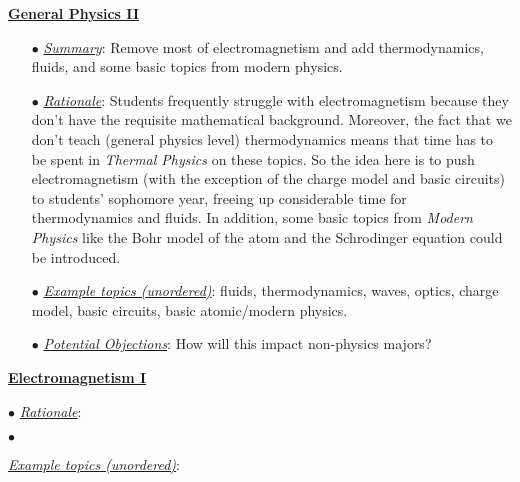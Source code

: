 \documentclass[12pt,preprint]{aastex}
\begin{document}
\begin{itemize*}
\item{\underline{{\bf General Physics II}}
  \begin{itemize}
    \item[$\bullet$]{\underline{\em Summary}: Remove most of electromagnetism
      and add thermodynamics, fluids, and some basic topics from modern
      physics.}
    \item[$\bullet$]{\underline{\em Rationale}: Students frequently struggle
      with electromagnetism because they don't have the requisite mathematical
      background.  Moreover, the fact that we don't teach (general physics
      level) thermodynamics means that time has to be spent in {\em Thermal
        Physics} on these topics.  So the idea here is to push electromagnetism
      (with the exception of the charge model and basic circuits) to students'
      sophomore year, freeing up considerable time for thermodynamics and
      fluids.  In addition, some basic topics from {\em Modern Physics} like the
      Bohr model of the atom and the Schrodinger equation could be introduced.}
    \item[$\bullet$]{\underline{\em Example topics (unordered)}: fluids,
      thermodynamics, waves, optics, charge model, basic circuits, basic
      atomic/modern physics.}
    \item[$\bullet$]{\underline{\em Potential Objections}: How will this impact
      non-physics majors?}
  \end{itemize}
}
  
\item{\underline{{\bf Electromagnetism I}}

  \begin{itemize*}
    \item[$\bullet$]{\underline{\em Rationale}: }
    \item[$\bullet$]{\underline{\em Example topics (unordered)}: 

}
  \end{itemize*}
}
\end{itemize*}
\end{document}
